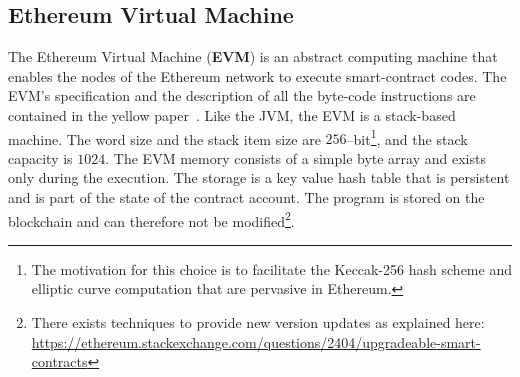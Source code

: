\subsection{Ethereum Virtual Machine}
The Ethereum Virtual Machine (\textbf{EVM}) is an abstract computing machine
that enables the nodes of the Ethereum network to execute smart-contract
codes.
The EVM's specification and the description of all the byte-code instructions
are contained in the yellow paper~\cite{wood2018ethereum}. 
Like the JVM, the EVM is a stack-based machine. 
The word size and the stack item size are $256$--bit\footnote{The motivation
for this choice is to facilitate the Keccak-256 hash scheme and elliptic
curve computation that are pervasive in Ethereum.},
and the stack capacity is $1024$.
The EVM memory consists of a simple byte array and exists only during the
execution. The storage is a key value hash table that is persistent and is
part of the state of the contract account. The program is stored on the
blockchain and can therefore not be modified\footnote{There exists
techniques to provide new version updates as explained
here:
\url{https://ethereum.stackexchange.com/questions/2404/upgradeable-smart-contracts}}.


